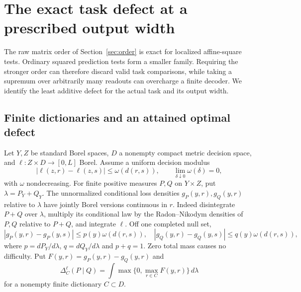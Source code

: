 \section{The exact task defect at a prescribed output width}\label{sec:width-defect}
The raw matrix order of Section~\ref{sec:order} is exact for localized affine-square tests. Ordinary squared prediction tests form a smaller family. Requiring the stronger order can therefore discard valid task comparisons, while taking a supremum over arbitrarily many readouts can overcharge a finite decoder. We identify the least additive defect for the actual task and its output width.

\subsection{Finite dictionaries and an attained optimal defect}
Let $Y,Z$ be standard Borel spaces, $D$ a nonempty compact metric decision space, and $\ell:Z\times D\to[0,L]$ Borel. Assume a uniform decision modulus
\begin{equation}\label{eq:loss-modulus}
 |\ell(z,r)-\ell(z,s)|\le\omega(d(r,s)),\qquad
 \lim_{\delta\downarrow0}\omega(\delta)=0,
\end{equation}
with $\omega$ nondecreasing. For finite positive measures $P,Q$ on $Y\times Z$, put $\lambda=P_Y+Q_Y$. The unnormalized conditional loss densities $g_P(y,r),g_Q(y,r)$ relative to $\lambda$ have jointly Borel versions continuous in $r$. Indeed disintegrate $P+Q$ over $\lambda$, multiply its conditional law by the Radon--Nikodym densities of $P,Q$ relative to $P+Q$, and integrate $\ell$. Off one completed null set,
\[
 |g_P(y,r)-g_P(y,s)|\le p(y)\omega(d(r,s)),\quad
 |g_Q(y,r)-g_Q(y,s)|\le q(y)\omega(d(r,s)),
\]
where $p=dP_Y/d\lambda$, $q=dQ_Y/d\lambda$ and $p+q=1$. Zero total mass causes no difficulty. Put $F(y,r)=g_P(y,r)-g_Q(y,r)$ and
\[
 \Delta_C^\ell(P\mid Q)=\int\max\{0,\max_{r\in C}F(y,r)\}\,d\lambda
\]
for a nonempty finite dictionary $C\subset D$.

